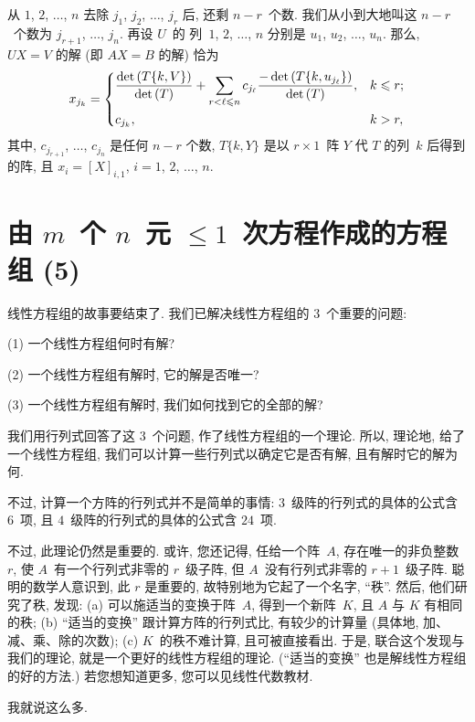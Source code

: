 \documentclass[../libro.tex]{subfiles}
\begin{document}
\begin{theorem}
    从 \(1\), \(2\), \(\dots\), \(n\)
    去除 \(j_1\), \(j_2\), \(\dots\), \(j_r\)
    后, 还剩 \(n - r\)~个数.
    我们从小到大地叫这 \(n - r\)~个数为
    \(j_{r+1}\), \(\dots\), \(j_n\).
    再设 \(U\)~的%
    列~\(1\), \(2\), \(\dots\), \(n\)
    分别是 \(u_1\), \(u_2\), \(\dots\), \(u_n\).
    那么, \(UX = V\) 的解 (即 \(AX = B\) 的解) 恰为
    \begin{align*}
        x_{j_k} =
        \begin{dcases}
            \frac{\det {(T\{k,V\})}}{\det {(T)}}
            + \sum_{r < \ell \leq n}
            {c_{j_\ell}
            \frac{-\det {(T\{k,u_{j_\ell}\})}}{\det {(T)}}},
            & k \leq r; \\
            c_{j_k},
            & k > r,
        \end{dcases}
    \end{align*}
    其中,
    \(c_{j_{r+1}}\), \(\dots\), \(c_{j_n}\)
    是任何 \(n-r\) 个数,
    \(T\{k,Y\}\) 是以 \(r \times 1\)~阵 \(Y\)
    代 \(T\) 的列~\(k\) 后得到的阵,
    且 \(x_i = [X]_{i,1}\),
    \(i = 1\), \(2\), \(\dots\), \(n\).
\end{theorem}

\KunAsteriskoEnEnhavtabelo
\section{\texorpdfstring{由 \(m\)~个 \(n\)~元
    \({\leq} 1\)~次方程作成的方程组 (5)}%
{由 m 个 n 元 ≤1 次方程作成的方程组 (5)}}
\SenAsteriskoEnEnhavtabelo

\maldevigalegajxo

线性方程组的故事要结束了.
我们已解决线性方程组的 \(3\)~个重要的问题:

(1)
一个线性方程组何时有解?

(2)
一个线性方程组有解时, 它的解是否唯一?

(3)
一个线性方程组有解时, 我们如何找到它的全部的解?

我们用行列式回答了这 \(3\)~个问题,
作了线性方程组的一个理论.
所以, 理论地, 给了一个线性方程组,
我们可以计算一些行列式以确定它是否有解,
且有解时它的解为何.

不过,
计算一个方阵的行列式并不是简单的事情:
\(3\)~级阵的行列式的具体的公式含 \(6\)~项,
且 \(4\)~级阵的行列式的具体的公式含 \(24\)~项.

不过, 此理论仍然是重要的.
或许, 您还记得,
任给一个阵~\(A\),
存在唯一的非负整数 \(r\),
使 \(A\)~有一个行列式非零的 \(r\)~级子阵,
但 \(A\)~没有行列式非零的 \(r+1\)~级子阵.
聪明的数学人意识到,
此 \(r\) 是重要的,
故特别地为它起了一个名字, ``秩''.
然后, 他们研究了秩,
发现:
(a)
可以施适当的变换于阵~\(A\),
得到一个新阵~\(K\),
且 \(A\) 与 \(K\) 有相同的秩;
(b)
``适当的变换'' 跟计算方阵的行列式比,
有较少的计算量
(具体地, 加、减、乘、除的次数);
(c)
\(K\)~的秩不难计算,
且可被直接看出.
于是, 联合这个发现与我们的理论,
就是一个更好的线性方程组的理论.
(``适当的变换'' 也是解线性方程组的好的方法.)
若您想知道更多,
您可以见线性代数教材.

我就说这么多.
\end{document}
